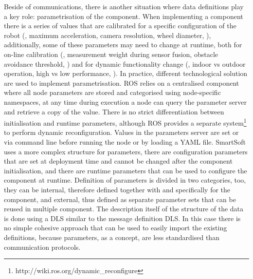 Beside of communications, there is another situation where data definitions play a key role: parametrisation of the component. When implementing a component there is a series of values that are calibrated for a specific configuration of the robot (\eg, maximum acceleration, camera resolution, wheel diameter, \etc), additionally, some of these parameters may need to change at runtime, both for on-line calibration (\eg, measurement weight during sensor fusion, obstacle avoidance threshold, \etc) and for dynamic functionality change (\eg, indoor vs outdoor operation, high vs low performance, \etc). In practice, different technological solution are used to implement parametrisation. ROS relies on a centralised component where all node parameters are stored and categorised using node-specific namespaces, at any time during execution a node can query the parameter server and retrieve a copy of the value. There is no strict differentiation between initialisation and runtime parameters, although ROS provides a separate system\footnote{http://wiki.ros.org/dynamic\_reconfigure} to perform dynamic reconfiguration. Values in the parameters server are set or via command line before running the node or by loading a YAML file. SmartSoft uses a more complex structure for parameters, there are configuration parameters that are set at deployment time and cannot be changed after the component initialisation, and there are runtime parameters that can be used to configure the component at runtime. Definition of parameters is divided in two categories, too, they can be internal, therefore defined together with and specifically for the component, and external, thus defined as separate parameter sets that can be reused in multiple component. The description itself of the structure of the data is done using a DLS similar to the message definition DLS. In this case there is no simple cohesive approach that can be used to easily import the existing definitions, because parameters, as a concept, are less standardised than communication protocols.

